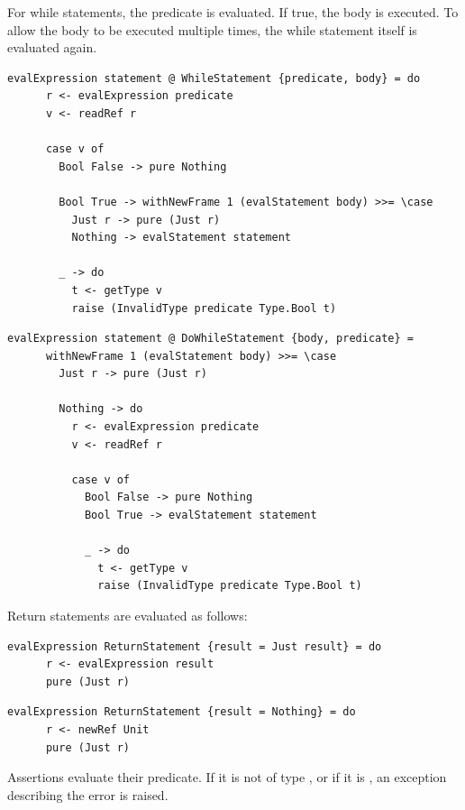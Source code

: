\documentclass[UdineBachThesis,american,11pt,draft]{PhdThesis}
\begin{document}
  For while statements, the predicate is evaluated. If true, the body is
  executed. To allow the body to be executed multiple times, the while statement
  itself is evaluated again.

  \begin{lstlisting}[gobble=4,basicstyle=\ttfamily\small]
    evalExpression statement @ WhileStatement {predicate, body} = do
      r <- evalExpression predicate
      v <- readRef r

      case v of
        Bool False -> pure Nothing

        Bool True -> withNewFrame 1 (evalStatement body) >>= \case
          Just r -> pure (Just r)
          Nothing -> evalStatement statement

        _ -> do
          t <- getType v
          raise (InvalidType predicate Type.Bool t)
  \end{lstlisting}

  \begin{lstlisting}[gobble=4,basicstyle=\ttfamily\small]
    evalExpression statement @ DoWhileStatement {body, predicate} =
      withNewFrame 1 (evalStatement body) >>= \case
        Just r -> pure (Just r)

        Nothing -> do
          r <- evalExpression predicate
          v <- readRef r

          case v of
            Bool False -> pure Nothing
            Bool True -> evalStatement statement

            _ -> do
              t <- getType v
              raise (InvalidType predicate Type.Bool t)
  \end{lstlisting}

  Return statements are evaluated as follows:

  \begin{lstlisting}[gobble=4,basicstyle=\ttfamily\small]
    evalExpression ReturnStatement {result = Just result} = do
      r <- evalExpression result
      pure (Just r)
  \end{lstlisting}

  \begin{lstlisting}[gobble=4,basicstyle=\ttfamily\small]
    evalExpression ReturnStatement {result = Nothing} = do
      r <- newRef Unit
      pure (Just r)
  \end{lstlisting}

  Assertions evaluate their predicate. If it is not of type \lstinline@Bool@,
  or if it is \lstinline@false@, an exception describing the error is raised.
\end{document}
